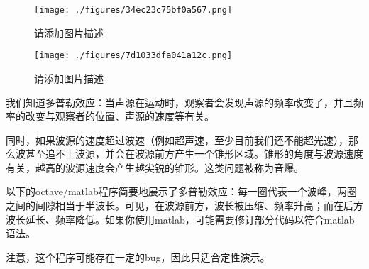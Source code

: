 
\begin{figure}[ht]
\centering
\texttt{[image: ./figures/34ec23c75bf0a567.png]}
\caption{请添加图片描述} \label{fig_DPLDRW_1}
\end{figure}

\begin{figure}[ht]
\centering
\texttt{[image: ./figures/7d1033dfa041a12c.png]}
\caption{请添加图片描述} \label{fig_DPLDRW_2}
\end{figure}
我们知道多普勒效应：当声源在运动时，观察者会发现声源的频率改变了，并且频率的改变与观察者的位置、声源的速度等有关。

同时，如果波源的速度超过波速（例如超声速，至少目前我们还不能超光速），那么波甚至追不上波源，并会在波源前方产生一个锥形区域。锥形的角度与波源速度有关，越高的波源速度会产生越尖锐的锥形。这类问题被称为音爆。

以下的octave/matlab程序简要地展示了多普勒效应：每一圈代表一个波峰，两圈之间的间隙相当于半波长。可见，在波源前方，波长被压缩、频率升高；而在后方波长延长、频率降低。如果你使用matlab，可能需要修订部分代码以符合matlab语法。

注意，这个程序可能存在一定的bug，因此只适合定性演示。

